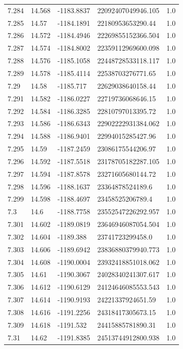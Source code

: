 \begin{tabular}{lllll}
7.284 & 14.568 & -1183.8837 & 22092407049946.105 & 1.0 \\
7.285 & 14.57 & -1184.1891 & 22180953653290.44 & 1.0 \\
7.286 & 14.572 & -1184.4946 & 22269855152366.504 & 1.0 \\
7.287 & 14.574 & -1184.8002 & 22359112969600.098 & 1.0 \\
7.288 & 14.576 & -1185.1058 & 22448728533118.117 & 1.0 \\
7.289 & 14.578 & -1185.4114 & 22538703276771.65 & 1.0 \\
7.29 & 14.58 & -1185.717 & 22629038640158.44 & 1.0 \\
7.291 & 14.582 & -1186.0227 & 22719736068646.15 & 1.0 \\
7.292 & 14.584 & -1186.3285 & 22810797013395.72 & 1.0 \\
7.293 & 14.586 & -1186.6343 & 22902222931384.062 & 1.0 \\
7.294 & 14.588 & -1186.9401 & 22994015285427.96 & 1.0 \\
7.295 & 14.59 & -1187.2459 & 23086175544206.97 & 1.0 \\
7.296 & 14.592 & -1187.5518 & 23178705182287.105 & 1.0 \\
7.297 & 14.594 & -1187.8578 & 23271605680144.72 & 1.0 \\
7.298 & 14.596 & -1188.1637 & 23364878524189.6 & 1.0 \\
7.299 & 14.598 & -1188.4697 & 23458525206789.4 & 1.0 \\
7.3 & 14.6 & -1188.7758 & 23552547226292.957 & 1.0 \\
7.301 & 14.602 & -1189.0819 & 23646946087054.504 & 1.0 \\
7.302 & 14.604 & -1189.388 & 23741723299458.0 & 1.0 \\
7.303 & 14.606 & -1189.6942 & 23836880379940.773 & 1.0 \\
7.304 & 14.608 & -1190.0004 & 23932418851018.062 & 1.0 \\
7.305 & 14.61 & -1190.3067 & 24028340241307.617 & 1.0 \\
7.306 & 14.612 & -1190.6129 & 24124646085553.543 & 1.0 \\
7.307 & 14.614 & -1190.9193 & 24221337924651.59 & 1.0 \\
7.308 & 14.616 & -1191.2256 & 24318417305673.15 & 1.0 \\
7.309 & 14.618 & -1191.532 & 24415885781890.31 & 1.0 \\
7.31 & 14.62 & -1191.8385 & 24513744912800.938 & 1.0 \\

\end{tabular}
